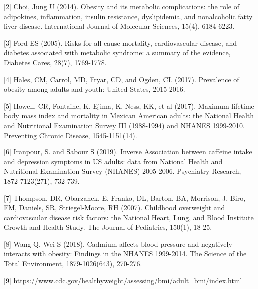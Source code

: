 \documentclass[12pt]{article}
\numberwithin{figure}{section}
\begin{document}
[2] Choi, Jung U (2014). Obesity and its metabolic complications: the role of adipokines, inflammation, insulin resistance, dyslipidemia, and nonalcoholic fatty liver disease.  International Journal of Molecular Sciences, 15(4), 6184-6223.

[3] Ford ES (2005). Risks for all-cause mortality, cardiovascular disease, and diabetes associated with metabolic syndrome: a summary of the evidence, Diabetes Cares, 28(7), 1769-1778.

[4] Hales, CM, Carrol, MD, Fryar, CD, and Ogden, CL (2017). Prevalence of obesity among adults and youth: United States, 2015-2016.

[5] Howell, CR, Fontaine, K, Ejima, K, Ness, KK, et al (2017). Maximum lifetime body mass index and mortality in Mexican American adults: the National Health and Nutritional Examination Survey III (1988-1994) and NHANES 1999-2010. Preventing Chronic Disease, 1545-1151(14).

[6] Iranpour, S. and Sabour S (2019). Inverse Association between caffeine intake and depression symptoms in US adults: data from National Health and Nutritional Examination Survey (NHANES) 2005-2006. Psychiatry Research, 1872-7123(271), 732-739.

[7] Thompson, DR, Obarzanek, E, Franko, DL, Barton, BA, Morrison, J, Biro, FM, Daniels, SR, Striegel-Moore, RH (2007).  Childhood overweight and cardiovascular disease risk factors: the National Heart, Lung, and Blood Institute Growth and Health Study. The Journal of Pediatrics, 150(1), 18-25.

[8] Wang Q, Wei S (2018). Cadmium affects blood pressure and negatively interacts with obesity: Findings in the NHANES 1999-2014. The Science of the Total Environment, 1879-1026(643), 270-276.

[9] \url{https://www.cdc.gov/healthyweight/assessing/bmi/adult_bmi/index.html}
\end{document}
